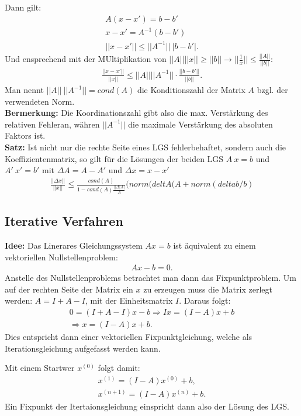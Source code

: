 \documentclass{scrartcl}
\begin{document}
Dann gilt:
\begin{align*}
A(x-x')=b-b' \\
x-x'=A^{-1}(b-b')\\
||x-x'|| \leq ||A^{-1}|| \ |b-b'|.
\end{align*}
Und ensprechend mit der MUltiplikation von $||A|| ||x|| \geq ||b|| \rightarrow ||\frac{1}{x}|| \leq \frac{||A||}{||b||}$:
\begin{align*}
\frac{||x-x'||}{||x||} \leq ||A|| ||A^{-1}|| \cdot \frac{||b-b'||}{||b||}.
\end{align*}
Man nennt $||A|| \ ||A^{-1}||=cond(A)$ die Konditionszahl der Matrix $A$ bzgl. der verwendeten Norm. \\
\textbf{Bermerkung:} Die Koordinationszahl gibt also die max. Verstärkung des relativen Fehleran, währen $||A^{-1}||$ die maximale Verstärkung des absoluten Faktors ist.\\
\textbf{Satz:} Ist nicht nur die rechte Seite eines LGS fehlerbehaftet, sondern auch die Koeffizientenmatrix, so gilt für die Lösungen der beiden LGS $A \ x = b$ und $A' \ x' = b'$ mit $\Delta A= A-A'$ und $\Delta x= x-x'$
\begin{align*}
\frac{||\Delta x||}{||x||} \leq \frac{cond(A)}{1-cond(A) \frac{||\Delta|A|}{A}}   (norm( deltA(A + norm( deltab/b)
\end{align*}

\subsection{Iterative Verfahren}
\textbf{Idee:} Das Linerares Gleichungssystem $A x=b$ ist äquivalent zu einem vektoriellen Nullstellenproblem:
\begin{align*}
Ax-b=0.
\end{align*}
Anstelle des Nullstellenproblems betrachtet man dann das Fixpunktproblem.
Um auf der rechten Seite der Matrix ein $x$ zu erzeugen muss die Matrix zerlegt werden: $A=I+A-I$, mit der Einheitsmatrix $I$. Daraus folgt:
\begin{align*}
0=(I+A-I)x-b \Rightarrow I x=(I-A)x+b\\
\Rightarrow x=(I-A)x+b.
\end{align*}
Dies entspricht dann einer vektoriellen Fixpunktgleichung, welche als Iterationsgleichung aufgefasst werden kann.

Mit einem Startwer $x^{(0)}$ folgt damit:
\begin{align*}
x^{(1)}=(I-A)x^{(0)}+b, \\
x^{(n+1)}=(I-A)x^{(n)}+b.
\end{align*}
Ein Fixpunkt der Itertaionsgleichung einspricht dann also der Lösung des LGS.
\end{document}

